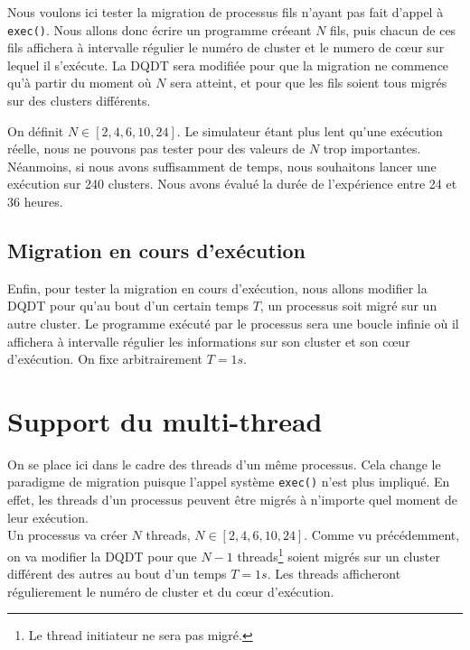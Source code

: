       Nous voulons ici tester la migration de processus fils n'ayant pas fait
      d'appel à \texttt{exec()}. Nous allons donc écrire un programme créeant
      $N$ fils, puis chacun de ces fils affichera à intervalle régulier le
      numéro de cluster et le numero de c\oe ur sur lequel il s'exécute. La DQDT
      sera modifiée pour que la migration ne commence qu'à partir du moment où
      $N$ sera atteint, et pour que les fils soient tous migrés sur des clusters
      différents.

      On définit $N \in [2, 4, 6, 10, 24]$. Le simulateur étant plus lent qu'une
      exécution réelle, nous ne pouvons pas tester pour des valeurs de $N$ trop
      importantes. Néanmoins, si nous avons suffisamment de temps, nous
      souhaitons lancer une exécution sur 240 clusters. Nous avons évalué la
      durée de l'expérience entre 24 et 36 heures.

    \subsection{Migration en cours d'exécution}

      Enfin, pour tester la migration en cours d'exécution, nous allons modifier
      la DQDT pour qu'au bout d'un certain temps $T$, un processus soit migré
      sur un autre cluster. Le programme exécuté par le processus sera une
      boucle infinie où il affichera à intervalle régulier les informations sur
      son cluster et son c\oe ur d'exécution. On fixe arbitrairement $T = 1s$.

  \section{Support du multi-thread}

    On se place ici dans le cadre des threads d'un même processus. Cela change
    le paradigme de migration puisque l'appel système \texttt{exec()} n'est plus
    impliqué. En effet, les threads d'un processus peuvent être migrés à
    n'importe quel moment de leur exécution.\\

    Un processus va créer $N$ threads, $N \in [2, 4, 6, 10, 24]$. Comme vu
    précédemment, on va modifier la DQDT pour que $N-1$ threads\footnote{Le
      thread initiateur ne sera pas migré.} soient migrés sur un cluster
    différent des autres au bout d'un temps $T = 1s$. Les threads afficheront
    régulierement le numéro de cluster et du c\oe ur d'exécution.


